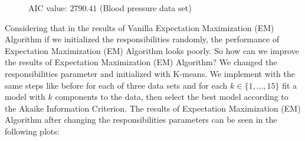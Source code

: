 \documentclass[abstract=true]{scrartcl}
\begin{document}
\begin{figure}[H]
\begin{minipage}[t]{0.5\textwidth}
 		\vspace{-20px}
 		\caption{AIC value: $2790.41$ (Blood pressure data set)}
	\end{minipage}
	\hspace{10px}
	\noindent{}
\end{figure}
Considering that in the results of Vanilla Expectation Maximization (EM) Algorithm if we initialized the responsibilities randomly, the performance of Expectation Maximization (EM) Algorithm looks poorly. So how can we improve the results of Expectation Maximization (EM) Algorithm? We changed the responsibilities parameter and initialized with K-means. We implement with the same steps like before for each of three data sets and for each $k \in \{1,...,15\}$ fit a model with $k$ components to the data, then select the best model according to the Akaike Information Criterion. The results of Expectation Maximization (EM) Algorithm after changing the responsibilities parameters can be seen in the following plots: 
\vspace{-10px}
\end{document}
